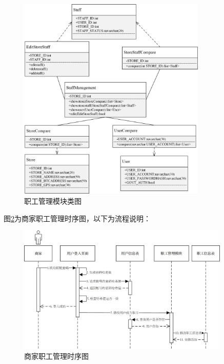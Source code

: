 	\begin{figure}[!htbp]
		\centering
		\includegraphics[width = 0.8\textwidth]{c1.jpg}
		\caption{职工管理模块类图}\label{c1}
	\end{figure}

	

	图\ref{time2}为商家职工管理时序图，以下为流程说明：

	\begin{figure}[!htbp]
		\centering
		\includegraphics[width = 0.9\textwidth]{time2.jpg}
		\caption{商家职工管理时序图}\label{time2}
	\end{figure}

